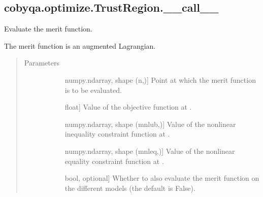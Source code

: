 \documentclass[letterpaper,10pt,english]{sphinxmanual}
\begin{document}
\begin{fulllineitems}
\subsection{cobyqa.optimize.TrustRegion.\_\_call\_\_}
\label{\detokenize{refs/generated/cobyqa.optimize.TrustRegion.__call__:cobyqa-optimize-trustregion-call}}\label{\detokenize{refs/generated/cobyqa.optimize.TrustRegion.__call__::doc}}

\begin{fulllineitems}
\label{\detokenize{refs/generated/cobyqa.optimize.TrustRegion.__call__:cobyqa.optimize.TrustRegion.__call__}}
\sphinxAtStartPar
Evaluate the merit function.

\sphinxAtStartPar
The merit function is an augmented Lagrangian.
\begin{quote}\begin{description}
\item[{Parameters}] \leavevmode\begin{description}
\item[{}] \leavevmode{[}numpy.ndarray, shape (n,){]}
\sphinxAtStartPar
Point at which the merit function is to be evaluated.

\item[{}] \leavevmode{[}float{]}
\sphinxAtStartPar
Value of the objective function at .

\item[{}] \leavevmode{[}numpy.ndarray, shape (mnlub,){]}
\sphinxAtStartPar
Value of the nonlinear inequality constraint function at .

\item[{}] \leavevmode{[}numpy.ndarray, shape (mnleq,){]}
\sphinxAtStartPar
Value of the nonlinear equality constraint function at .

\item[{}] \leavevmode{[}bool, optional{]}
\sphinxAtStartPar
Whether to also evaluate the merit function on the different models
(the default is False).


\end{description}
\end{description}
\end{quote}
\end{fulllineitems}
\end{fulllineitems}
\end{document}

